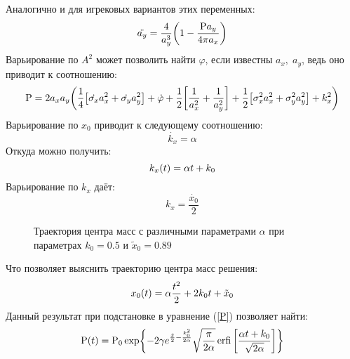 \documentclass[titlepage]{article}
\DeclareMathOperator\erfi{erfi}
\begin{document}
Аналогично и для игрековых вариантов этих переменных:
\begin{equation}
 \ddot{a_y} = \frac{4}{a_y^3} \qty(1 - \frac{\mathrm{P}a_y}{4\pi a_x})
\end{equation}
Варьирование по $A^2$ может позволить найти $\varphi$, если известны $a_x,\; a_y$, ведь оно приводит к соотношению:
\begin{equation}
 \mathrm{P} = 2a_xa_y\qty(\frac14\qty[\dot{\sigma_x}a_x^2+\dot{\sigma_y}a_y^2]+\dot{\varphi}+\frac12\qty[\frac{1}{a_x^2}+\frac{1}{a_y^2}]+\frac12\qty[\sigma_x^2a_x^2+\sigma_y^2a_y^2]+k_x^2)
\end{equation}
Варьирование по $x_0$ приводит к следующему соотношению:
\begin{equation}
 \dot{k_x} = \alpha
\end{equation}
Откуда можно получить:
\begin{equation}
 k_x\qty(t) = \alpha t + k_0
\end{equation}
Варьирование по $k_x$ даёт:
\begin{equation}
 k_x = \dfrac{\dot{x_0}}{2}
\end{equation}
\begin{figure}[t]
\centering
\caption{Траектория центра масс с различными параметрами $\alpha$ при параметрах $k_0 = 0.5$ и $\tilde{x}_0 = 0.89$}
\label{pic:speed}
\end{figure}
Что позволяет выяснить траекторию центра масс решения:
\begin{equation}
 x_0\qty(t) = \alpha \dfrac{t^2}{2} + 2 k_0 t +\tilde{x}_0
\end{equation}
Данный результат при подстановке в уравнение (\ref{P}) позволяет найти:
\begin{equation}
 \mathrm{P} \qty(t) = \mathrm{P_0} \exp{-2\gamma e^{\frac{\tilde{x}}{2} - \frac{k_0^2}{2\alpha}} \sqrt{\frac{\pi}{2\alpha}}\erfi{\qty[\frac{\alpha t + k_0}{\sqrt{2\alpha}}]}}
\end{equation}
\end{document}
